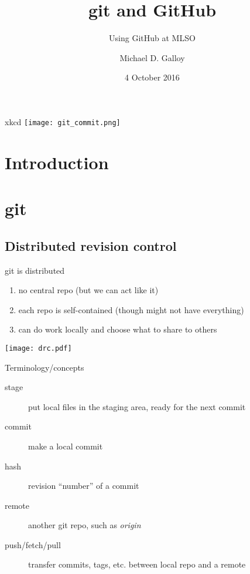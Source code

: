 \documentclass{beamer}
\title{git and GitHub}
\subtitle{Using GitHub at MLSO}
\author{Michael D. Galloy}
\institute[NCAR/MLSO]{NCAR/HAO --- MLSO}
\date{4 October 2016}
\begin{document}
\begin{frame}{xkcd}
  \texttt{[image: git\_commit.png]}
\end{frame}

\begin{frame}[plain]
  \titlepage
\end{frame}


\section{Introduction}
\subsection*{}

\begin{frame}
  \tableofcontents
\end{frame}


\section{git}

\subsection{Distributed revision control}
\begin{frame}{git is distributed}
  \begin{enumerate}
    \item no central repo (but we can act like it)
    \item each repo is self-contained (though might not have everything)
    \item can do work locally and choose what to share to others
  \end{enumerate}
  \begin{center}
    \texttt{[image: drc.pdf]}
  \end{center}
\end{frame}

\begin{frame}{Terminology/concepts}
  \begin{description}
    \item[stage] put local files in the staging area, ready for the next commit
    \item[commit] make a local commit
    \item[hash] revision ``number'' of a commit
    \item[remote] another git repo, such as {\em origin}
    \item[push/fetch/pull] transfer commits, tags, etc. between local repo and a remote
  \end{description}
\end{frame}
\end{document}
